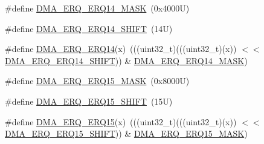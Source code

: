 \begin{DoxyCompactItemize}
\item 
\#define \mbox{\hyperlink{group___d_m_a___register___masks_ga41e772c4e32bb0c2546bd32b9207aece}{D\+M\+A\+\_\+\+E\+R\+Q\+\_\+\+E\+R\+Q14\+\_\+\+M\+A\+SK}}~(0x4000\+U)
\item 
\#define \mbox{\hyperlink{group___d_m_a___register___masks_gaa8b288df3c11c83516e460ec8f1c06b6}{D\+M\+A\+\_\+\+E\+R\+Q\+\_\+\+E\+R\+Q14\+\_\+\+S\+H\+I\+FT}}~(14\+U)
\item 
\#define \mbox{\hyperlink{group___d_m_a___register___masks_ga3e60d0ef67148e8d6a9b2584e64cc3cb}{D\+M\+A\+\_\+\+E\+R\+Q\+\_\+\+E\+R\+Q14}}(x)~(((uint32\+\_\+t)(((uint32\+\_\+t)(x)) $<$$<$ \mbox{\hyperlink{group___d_m_a___register___masks_gaa8b288df3c11c83516e460ec8f1c06b6}{D\+M\+A\+\_\+\+E\+R\+Q\+\_\+\+E\+R\+Q14\+\_\+\+S\+H\+I\+FT}})) \& \mbox{\hyperlink{group___d_m_a___register___masks_ga41e772c4e32bb0c2546bd32b9207aece}{D\+M\+A\+\_\+\+E\+R\+Q\+\_\+\+E\+R\+Q14\+\_\+\+M\+A\+SK}})
\item 
\#define \mbox{\hyperlink{group___d_m_a___register___masks_ga6152f3575742083b05d6df10bd9d09e5}{D\+M\+A\+\_\+\+E\+R\+Q\+\_\+\+E\+R\+Q15\+\_\+\+M\+A\+SK}}~(0x8000\+U)
\item 
\#define \mbox{\hyperlink{group___d_m_a___register___masks_ga49ce30d8d6925a45dfc85fdf08b71bfd}{D\+M\+A\+\_\+\+E\+R\+Q\+\_\+\+E\+R\+Q15\+\_\+\+S\+H\+I\+FT}}~(15\+U)
\item 
\#define \mbox{\hyperlink{group___d_m_a___register___masks_gae9b2091d09c41abda5d01383c39f62d8}{D\+M\+A\+\_\+\+E\+R\+Q\+\_\+\+E\+R\+Q15}}(x)~(((uint32\+\_\+t)(((uint32\+\_\+t)(x)) $<$$<$ \mbox{\hyperlink{group___d_m_a___register___masks_ga49ce30d8d6925a45dfc85fdf08b71bfd}{D\+M\+A\+\_\+\+E\+R\+Q\+\_\+\+E\+R\+Q15\+\_\+\+S\+H\+I\+FT}})) \& \mbox{\hyperlink{group___d_m_a___register___masks_ga6152f3575742083b05d6df10bd9d09e5}{D\+M\+A\+\_\+\+E\+R\+Q\+\_\+\+E\+R\+Q15\+\_\+\+M\+A\+SK}})
\end{DoxyCompactItemize}

